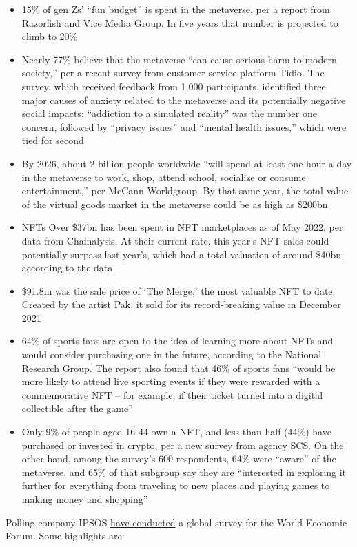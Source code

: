 {\begin{itemize}
\item 15\% of gen Zs’ “fun budget” is spent in the metaverse, per a report from Razorfish and Vice Media Group. In five years that number is projected to climb to 20\%
\item Nearly 77\% believe that the metaverse “can cause serious harm to modern society,” per a recent survey from customer service platform Tidio. The survey, which received feedback from 1,000 participants, identified three major causes of anxiety related to the metaverse and its potentially negative social impacts: “addiction to a simulated reality” was the number one concern, followed by “privacy issues” and “mental health issues,” which were tied for second
\item By 2026, about 2 billion people worldwide “will spend at least one hour a day in the metaverse to work, shop, attend school, socialize or consume entertainment,” per McCann Worldgroup. By that same year, the total value of the virtual goods market in the metaverse could be as high as \$200bn
\item NFTs
Over \$37bn has been spent in NFT marketplaces as of May 2022, per data from Chainalysis. At their current rate, this year’s NFT sales could potentially surpass last year’s, which had a total valuation of around \$40bn, according to the data
\item \$91.8m was the sale price of ‘The Merge,’ the most valuable NFT to date. Created by the artist Pak, it sold for its record-breaking value in December 2021
\item 64\% of sports fans are open to the idea of learning more about NFTs and would consider purchasing one in the future, according to the National Research Group. The report also found that 46\% of sports fans “would be more likely to attend live sporting events if they were rewarded with a commemorative NFT – for example, if their ticket turned into a digital collectible after the game”
\item Only 9\% of people aged 16-44 own a NFT, and less than half (44\%) have purchased or invested in crypto, per a new survey from agency SCS. On the other hand, among the survey’s 600 respondents, 64\% were “aware” of the metaverse, and 65\% of that subgroup say they are “interested in exploring it further for everything from traveling to new places and playing games to making money and shopping”
\end{itemize}}
Polling company IPSOS \href{https://www.ipsos.com/en/global-advisor-metaverse-extended-reality-may-2022}{have conducted} a global survey for the World Economic Forum. Some highlights are:
